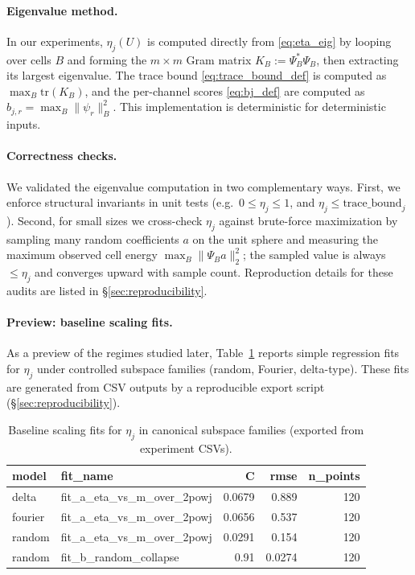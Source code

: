 \documentclass[11pt]{article}
\theoremstyle{plain}
\theoremstyle{definition}
\theoremstyle{remark}
\begin{document}
\paragraph{Eigenvalue method.}
In our experiments, \(\eta_j(U)\) is computed directly from \eqref{eq:eta_eig} by looping over cells \(B\) and forming the \(m\times m\) Gram matrix
\(K_B := \Psi_B^\ast \Psi_B\), then extracting its largest eigenvalue.
The trace bound \eqref{eq:trace_bound_def} is computed as \(\max_B \mathrm{tr}(K_B)\), and the per-channel scores \eqref{eq:bj_def} are computed as \(b_{j,r}=\max_B \|\psi_r\|_B^2\).
This implementation is deterministic for deterministic inputs.

\paragraph{Correctness checks.}
We validated the eigenvalue computation in two complementary ways.
First, we enforce structural invariants in unit tests (e.g.\ \(0 \le \eta_j \le 1\), and \(\eta_j \le \mathrm{trace\_bound}_j\)).
Second, for small sizes we cross-check \(\eta_j\) against brute-force maximization by sampling many random coefficients \(a\) on the unit sphere and measuring the maximum observed cell energy \(\max_B \|\Psi_B a\|_2^2\); the sampled value is always \(\le \eta_j\) and converges upward with sample count.
Reproduction details for these audits are listed in \S\ref{sec:reproducibility}.

\paragraph{Preview: baseline scaling fits.}
As a preview of the regimes studied later, Table~\ref{tab:baseline-scaling-fits} reports simple regression fits for \(\eta_j\) under controlled subspace families (random, Fourier, delta-type).
These fits are generated from CSV outputs by a reproducible export script (\S\ref{sec:reproducibility}).

\begin{table}[t]
\centering
\begin{tabular}{llrrr}
\toprule
model & fit\_name & C & rmse & n\_points \\
\midrule
delta & fit\_a\_eta\_vs\_m\_over\_2powj & 0.0679 & 0.889 & 120 \\
fourier & fit\_a\_eta\_vs\_m\_over\_2powj & 0.0656 & 0.537 & 120 \\
random & fit\_a\_eta\_vs\_m\_over\_2powj & 0.0291 & 0.154 & 120 \\
random & fit\_b\_random\_collapse & 0.91 & 0.0274 & 120 \\
\bottomrule
\end{tabular}
 \caption{Baseline scaling fits for \(\eta_j\) in canonical subspace families (exported from experiment CSVs).}
\label{tab:baseline-scaling-fits}
\end{table}
\end{document}
